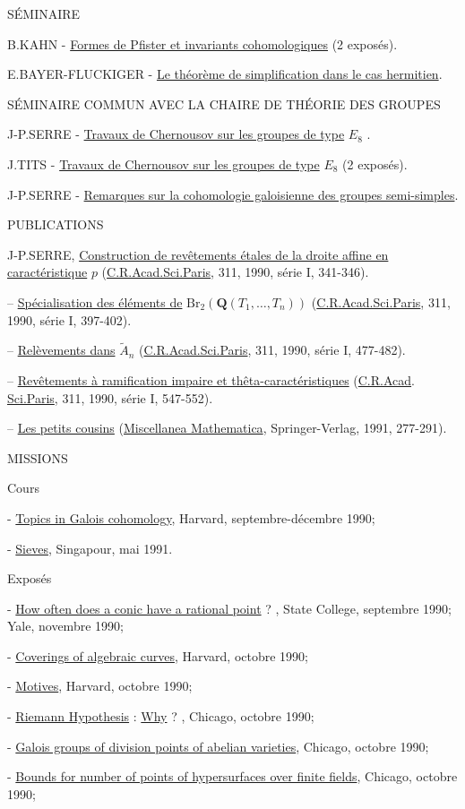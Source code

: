 
SÉMINAIRE

B.KAHN - \uline{Formes de Pfister et invariants cohomologiques} (2 exposés).

E.BAYER-FLUCKIGER - \uline{Le théorème de simplification dans le cas hermitien}.

SÉMINAIRE COMMUN AVEC LA CHAIRE DE THÉORIE DES GROUPES

J-P.SERRE - \uline{Travaux de Chernousov sur les groupes de type} $E_8$ .

J.TITS - \uline{Travaux de Chernousov sur les groupes de type} $E_8$ (2 exposés).

J-P.SERRE - \uline{Remarques sur la cohomologie galoisienne des groupes semi-simples}.

PUBLICATIONS

J-P.SERRE, \uline{Construction de revêtements étales de la droite affine en}
\uline{caractéristique} $p$ (\uline{C.R.Acad.Sci.Paris}, 311, 1990, série I, 341-346).

-- \uline{Spécialisation des éléments de} $\mathrm{Br}_2(\mathbf{Q}(T_1,\dots,T_n))$ (\uline{C.R.Acad.Sci.Paris},
311, 1990, série I, 397-402).

-- \uline{Relèvements dans} $\tilde{A}_n$ (\uline{C.R.Acad.Sci.Paris}, 311, 1990, série I, 477-482).

-- \uline{Revêtements à ramification impaire et thêta-caractéristiques} (\uline{C.R.Acad}.
\uline{Sci.Paris}, 311, 1990, série I, 547-552).

-- \uline{Les petits cousins} (\uline{Miscellanea Mathematica}, Springer-Verlag, 1991,
277-291).

MISSIONS

Cours

- \uline{Topics in Galois cohomology}, Harvard, septembre-décembre 1990;

- \uline{Sieves}, Singapour, mai 1991.

Exposés

- \uline{How often does a conic have a rational point} ? , State College, septembre
1990; Yale, novembre 1990;

- \uline{Coverings of algebraic curves}, Harvard, octobre 1990;

- \uline{Motives}, Harvard, octobre 1990;

- \uline{Riemann Hypothesis} : \uline{Why} ? , Chicago, octobre 1990;

- \uline{Galois groups of division points of abelian varieties}, Chicago, octobre
1990;

- \uline{Bounds for number of points of hypersurfaces over finite fields}, Chicago,
octobre 1990;

